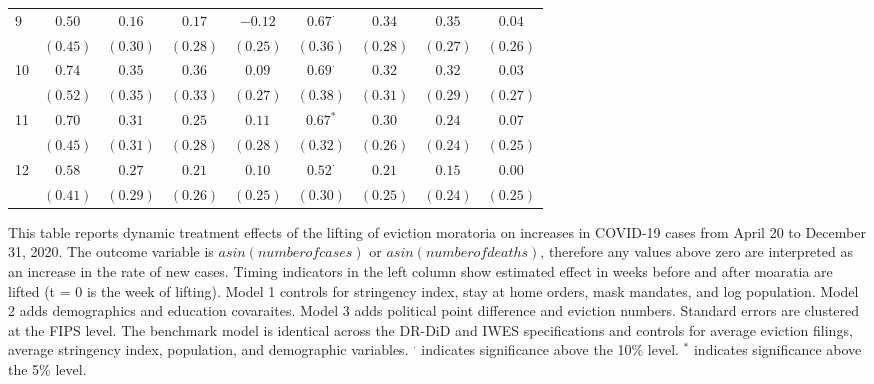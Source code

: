 \documentclass[12pt]{amsart}
\begin{document}
\begin{table}
\begin{center}
\begin{adjustbox}{width= 0.8\textwidth}
\begin{tabular}{l c c c c | c c c c}
9  & $0.50$         & $0.16$   & $0.17$   & $-0.12$         & $0.67^{\cdot}$ & $0.34$   & $0.35$   & $0.04$   \\
   & $(0.45)$       & $(0.30)$ & $(0.28)$ & $(0.25)$        & $(0.36)$       & $(0.28)$ & $(0.27)$ & $(0.26)$ \\
10 & $0.74$         & $0.35$   & $0.36$   & $0.09$          & $0.69^{\cdot}$ & $0.32$   & $0.32$   & $0.03$   \\
   & $(0.52)$       & $(0.35)$ & $(0.33)$ & $(0.27)$        & $(0.38)$       & $(0.31)$ & $(0.29)$ & $(0.27)$ \\
11 & $0.70$         & $0.31$   & $0.25$   & $0.11$          & $0.67^{*}$     & $0.30$   & $0.24$   & $0.07$   \\
   & $(0.45)$       & $(0.31)$ & $(0.28)$ & $(0.28)$        & $(0.32)$       & $(0.26)$ & $(0.24)$ & $(0.25)$ \\
12 & $0.58$         & $0.27$   & $0.21$   & $0.10$          & $0.52^{\cdot}$ & $0.21$   & $0.15$   & $0.00$   \\
   & $(0.41)$       & $(0.29)$ & $(0.26)$ & $(0.25)$        & $(0.30)$       & $(0.25)$ & $(0.24)$ & $(0.25)$ \\
\hline
\end{tabular}
\end{adjustbox}
\label{table:IWESestimates}
\end{center}
{\raggedright \footnotesize{This table reports dynamic treatment effects of the lifting of eviction moratoria on increases in COVID-19 cases from April 20 to December 31, 2020. The outcome variable is $asin(number of cases)$ or $asin(number of deaths)$, therefore any values above zero are interpreted as an increase in the rate of new cases. Timing indicators in the left column show estimated effect in weeks before and after moaratia are lifted (t = 0 is the week of lifting). Model 1 controls for stringency index, stay at home orders, mask mandates, and log population. Model 2 adds demographics and education covaraites. Model 3 adds political point difference and eviction numbers. Standard errors are clustered at the FIPS level. The benchmark model is identical across the DR-DiD and IWES specifications and controls for average eviction filings, average stringency index, population, and demographic variables. $^\cdot$ indicates significance above the 10\% level. $^*$ indicates significance above the 5\% level. \par}}
\end{table}
\end{document}
